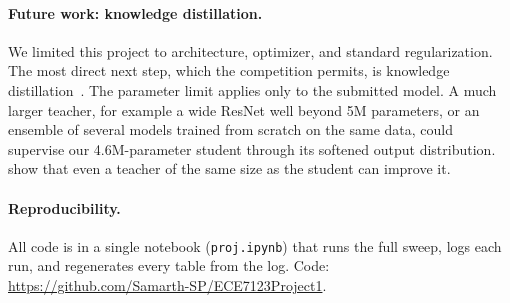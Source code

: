\documentclass[letterpaper]{article} %
\begin{document}
\paragraph{Future work: knowledge distillation.}
We limited this project to architecture, optimizer, and standard regularization. The most direct next step, which the competition permits, is knowledge distillation~\citep{hinton2015distilling}. The parameter limit applies only to the submitted model. A much larger teacher, for example a wide ResNet well beyond 5M parameters, or an ensemble of several models trained from scratch on the same data, could supervise our 4.6M-parameter student through its softened output distribution. \citet{furlanello2018born} show that even a teacher of the same size as the student can improve it.

\paragraph{Reproducibility.}
All code is in a single notebook (\texttt{proj.ipynb}) that runs the full sweep, logs each run, and regenerates every table from the log. Code: \url{https://github.com/Samarth-SP/ECE7123Project1}.


\end{document}
